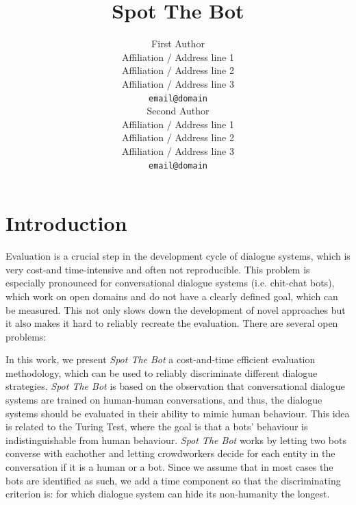 \documentclass[11pt,a4paper]{article}
\title{Spot The Bot}
\author{First Author \\
  Affiliation / Address line 1 \\
  Affiliation / Address line 2 \\
  Affiliation / Address line 3 \\
  \texttt{email@domain} \\\And
  Second Author \\
  Affiliation / Address line 1 \\
  Affiliation / Address line 2 \\
  Affiliation / Address line 3 \\
  \texttt{email@domain} \\}
\date{}
\begin{document}
\maketitle
\begin{abstract}

\end{abstract}

\section{Introduction}
Evaluation is a crucial step in the development cycle of dialogue systems, which is very cost-and time-intensive and often not reproducible. This problem is especially pronounced for conversational dialogue systems (i.e. chit-chat bots), which work on open domains and do not have a clearly defined goal, which can be measured. This not only slows down the development of novel approaches but it also makes it hard to reliably recreate the evaluation. 
There are several open problems: 

In this work, we present \emph{Spot The Bot} a cost-and-time efficient evaluation methodology, which can be used to reliably discriminate different dialogue strategies. \emph{Spot The Bot} is based on the observation that conversational dialogue systems are trained on human-human conversations, and thus, the dialogue systems should be evaluated in their ability to mimic human behaviour. This idea is related to the Turing Test, where the goal is that a bots' behaviour is indistinguishable from human behaviour.
\emph{Spot The Bot} works by letting two bots converse with eachother and letting crowdworkers decide for each entity in the conversation if it is a human or a bot. Since we assume that in most cases the bots are identified as such, we add a time component so that the discriminating criterion is: for which dialogue system can hide its non-humanity the longest. 
\end{document}

